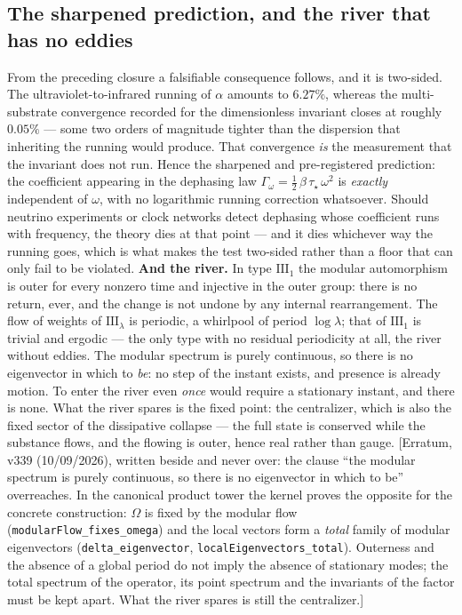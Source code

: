 \documentclass[11pt]{article}
\theoremstyle{definition}\newtheorem{deriv}{Derivation}
\begin{document}
\subsection*{The sharpened prediction, and the river that has no eddies}From the preceding closure a falsifiable consequence follows, and it is two-sided. The ultraviolet-to-infrared running of $\alpha$ amounts to $6.27\%$, whereas the multi-substrate convergence recorded for the dimensionless invariant closes at roughly $0.05\%$ --- some two orders of magnitude tighter than the dispersion that inheriting the running would produce. That convergence \emph{is} the measurement that the invariant does not run. Hence the sharpened and pre-registered prediction: the coefficient appearing in the dephasing law $\Gamma_\omega = \tfrac12\,\beta\,\tau_\star\,\omega^2$ is \emph{exactly} independent of $\omega$, with no logarithmic running correction whatsoever. Should neutrino experiments or clock networks detect dephasing whose coefficient runs with frequency, the theory dies at that point --- and it dies whichever way the running goes, which is what makes the test two-sided rather than a floor that can only fail to be violated. \textbf{And the river.} In type $\mathrm{III}_1$ the modular automorphism is outer for every nonzero time and injective in the outer group: there is no return, ever, and the change is not undone by any internal rearrangement. The flow of weights of $\mathrm{III}_\lambda$ is periodic, a whirlpool of period $\log\lambda$; that of $\mathrm{III}_1$ is trivial and ergodic --- the only type with no residual periodicity at all, the river without eddies. The modular spectrum is purely continuous, so there is no eigenvector in which to \emph{be}: no step of the instant exists, and presence is already motion. To enter the river even \emph{once} would require a stationary instant, and there is none. What the river spares is the fixed point: the centralizer, which is also the fixed sector of the dissipative collapse --- the full state is conserved while the substance flows, and the flowing is outer, hence real rather than gauge. [Erratum, v339 (10/09/2026), written beside and never over: the clause ``the modular spectrum is purely continuous, so there is no eigenvector in which to be'' overreaches. In the canonical product tower the kernel proves the opposite for the concrete construction: $\Omega$ is fixed by the modular flow (\texttt{modularFlow\_fixes\_omega}) and the local vectors form a \emph{total} family of modular eigenvectors (\texttt{delta\_eigenvector}, \texttt{localEigenvectors\_total}). Outerness and the absence of a global period do not imply the absence of stationary modes; the total spectrum of the operator, its point spectrum and the invariants of the factor must be kept apart. What the river spares is still the centralizer.]
\end{document}
